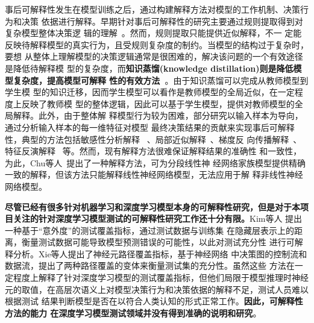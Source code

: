 事后可解释性发生在模型训练之后，通过构建解释方法对模型的工作机制、决策行为和决策
依据进行解释。早期针对事后可解释性的研究主要通过规则提取得到对复杂模型整体决策逻
辑的理解~。然而，规则提取只能提供近似解释，不一
定能反映待解释模型的真实行为，且受规则复杂度的制约。当模型的结构过于复杂时，要想
从整体上理解模型的决策逻辑通常是很困难的，解决该问题的一个有效途径是降低待解释模
型的复杂度，而\textbf{知识蒸馏(knowledge distillation)则是降低模型复杂度，提高模型可解释
性的有效方法~}。{由于知识蒸馏可以完成从教师模型到学生模
型的知识迁移，因而学生模型可以看作是教师模型的全局近似，在一定程度上反映了教师模
型的整体逻辑，因此可以基于学生模型，提供对教师模型的全局解释}。此外，由于整体解
释模型行为较为困难，部分研究以输入样本为导向，通过分析输入样本的每一维特征对模型
最终决策结果的贡献来实现事后可解释性，典型的方法包括敏感性分析解释
~、局部近似解释~、梯度反
向传播解释~、特征反演解释
~等。然而，现有解释方法很难保证解释结果的准确性
和一致性，为此，Chu等人~提出了一种解释方法，可为分段线性神
经网络家族模型提供精确一致的解释，但该方法只能解释线性神经网络模型，无法应用于解
释非线性神经网络模型。

\textbf{尽管已经有很多针对机器学习和深度学习模型本身的可解释性研究，但是对于本项
目关注的针对深度学习模型测试的可解释性研究工作还十分有限。}Kim等人
提出一种基于“意外度”的测试覆盖指标，通过测试数据与训练集
在隐藏层表示上的距离，衡量测试数据可能导致模型预测错误的可能性，以此对测试充分性
进行可解释分析。Xie等人提出了神经元路径覆盖指标，基于神经网络
中决策图的控制流和数据流，提出了两种路径覆盖的变体来衡量测试集的充分性。虽然这些
方法在一定程度上解释了针对深度学习模型的测试覆盖指标，但他们局限于模型推理时神经
元的取值，在高层次语义上对模型决策行为和决策依据的解释不足，测试人员难以根据测试
结果判断模型是否在以符合人类认知的形式正常工作。\textbf{因此，可解释性方法的能力
在深度学习模型测试领域并没有得到准确的说明和研究}。

\iffalse
\textbf{尽管已经有很多针对机器学习和深度学习模型本身的可解释性研究，但是对于本项
目关注的针对深度学习系统测试方面的可解释性研究工作还十分有限。}Kim等人
\citess{Kim2019Guiding}提出一种基于“意外度”的测试覆盖指标，通过度量测试数据与训
练集的不同距离，评估测试集对样本输入空间的覆盖度，从而对测试目标进行一定的可解释
性分析。Xie等人\citess{Xie2021NPC}提出了神经元路径覆盖指标，类似于传统的程序控制
流图，首先从深度神经网络中提取决策图用来表示模型的决策逻辑，然后基于决策图的控制
流和数据流，该方法提出了两种路径覆盖的变体来衡量测试数据在执行决策逻辑时的充分
性。该测试方法在一定程度上反映出模型的决策逻辑，但由于模型本身缺乏可解释性，难以
从控制流或数据流路径上辅助开发人员找到模型失效的原因，从而帮助修复模型。但是该方
法依赖于模型推理过程中的神经元取值，缺乏对模型决策行为的解释，难以检查模型是否在
以符合人类认知的形式正常工作。
\fi

